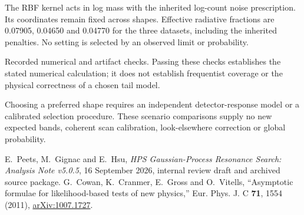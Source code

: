 \documentclass[11pt]{article}
\newcommand{\studtable}[2]{\begin{table}[H]\centering\small
 \caption{#2}\end{table}}
\begin{document}
The RBF kernel acts in log mass with the inherited log-count noise
prescription. Its coordinates remain fixed across shapes. Effective
radiative fractions are 0.07905, 0.04650 and 0.04770 for the three
datasets, including the inherited penalties. No setting is selected by
an observed limit or probability.

\studtable{../derived/qa_table.tex}{Recorded numerical and artifact
checks. Passing these checks establishes the stated numerical
calculation; it does not establish frequentist coverage or the physical
correctness of a chosen tail model.}

Choosing a preferred shape requires an independent detector-response
model or a calibrated selection procedure. These scenario comparisons
supply no new expected bands, coherent scan calibration, look-elsewhere
correction or global probability.

\begin{thebibliography}{9}
E.~Peets, M.~Gignac and E.~Hsu,
\emph{HPS Gaussian-Process Resonance Search: Analysis Note v5.0.5},
16 September 2026, internal review draft and archived source package.
G.~Cowan, K.~Cranmer, E.~Gross and O.~Vitells,
``Asymptotic formulae for likelihood-based tests of new physics,''
Eur. Phys. J. C \textbf{71}, 1554 (2011),
\href{https://arxiv.org/abs/1007.1727}{arXiv:1007.1727}.
\end{thebibliography}
\end{document}
